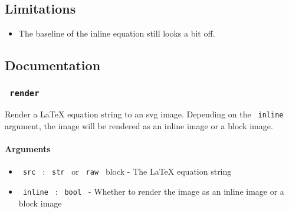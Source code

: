 \begin{Shaded}
\begin{Highlighting}[]




\end{Highlighting}
\end{Shaded}

\subsection{Limitations}\label{limitations}

\begin{itemize}
\tightlist
\item
  The baseline of the inline equation still looks a bit off.
\end{itemize}

\subsection{Documentation}\label{documentation}

\subsubsection{\texorpdfstring{\texttt{\ render\ }}{ render }}\label{render}

Render a LaTeX equation string to an svg image. Depending on the
\texttt{\ inline\ } argument, the image will be rendered as an inline
image or a block image.

\paragraph{Arguments}\label{arguments}

\begin{itemize}
\tightlist
\item
  \texttt{\ src\ } : \texttt{\ str\ } or \texttt{\ raw\ } block - The
  LaTeX equation string
\item
  \texttt{\ inline\ } : \texttt{\ bool\ } - Whether to render the image
  as an inline image or a block image
\end{itemize}

